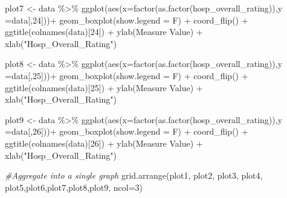 \documentclass[
]{article}
\newenvironment{Shaded}{\begin{snugshade}}{\end{snugshade}}
\newcommand{\AttributeTok}[1]{\textcolor[rgb]{0.77,0.63,0.00}{#1}}
\newcommand{\CommentTok}[1]{\textcolor[rgb]{0.56,0.35,0.01}{\textit{#1}}}
\newcommand{\DecValTok}[1]{\textcolor[rgb]{0.00,0.00,0.81}{#1}}
\newcommand{\FunctionTok}[1]{\textcolor[rgb]{0.00,0.00,0.00}{#1}}
\newcommand{\NormalTok}[1]{#1}
\newcommand{\OtherTok}[1]{\textcolor[rgb]{0.56,0.35,0.01}{#1}}
\newcommand{\SpecialCharTok}[1]{\textcolor[rgb]{0.00,0.00,0.00}{#1}}
\newcommand{\StringTok}[1]{\textcolor[rgb]{0.31,0.60,0.02}{#1}}
\begin{document}
\begin{Shaded}
\begin{Highlighting}[]
\NormalTok{plot7 }\OtherTok{\textless{}{-}}\NormalTok{ data }\SpecialCharTok{\%\textgreater{}\%} \FunctionTok{ggplot}\NormalTok{(}\FunctionTok{aes}\NormalTok{(}\AttributeTok{x=}\FunctionTok{factor}\NormalTok{(}\FunctionTok{as.factor}\NormalTok{(hosp\_overall\_rating)),}\AttributeTok{y =}\NormalTok{data[,}\DecValTok{24}\NormalTok{]))}\SpecialCharTok{+}
  \FunctionTok{geom\_boxplot}\NormalTok{(}\AttributeTok{show.legend =}\NormalTok{ F) }\SpecialCharTok{+}
  \FunctionTok{coord\_flip}\NormalTok{() }\SpecialCharTok{+}
  \FunctionTok{ggtitle}\NormalTok{(}\FunctionTok{colnames}\NormalTok{(data)[}\DecValTok{24}\NormalTok{]) }\SpecialCharTok{+} 
  \FunctionTok{ylab}\NormalTok{(}\StringTok{\textquotesingle{}Measure Value\textquotesingle{}}\NormalTok{) }\SpecialCharTok{+} \FunctionTok{xlab}\NormalTok{(}\StringTok{"Hosp\_Overall\_Rating"}\NormalTok{)}

\NormalTok{plot8 }\OtherTok{\textless{}{-}}\NormalTok{ data }\SpecialCharTok{\%\textgreater{}\%} \FunctionTok{ggplot}\NormalTok{(}\FunctionTok{aes}\NormalTok{(}\AttributeTok{x=}\FunctionTok{factor}\NormalTok{(}\FunctionTok{as.factor}\NormalTok{(hosp\_overall\_rating)),}\AttributeTok{y =}\NormalTok{data[,}\DecValTok{25}\NormalTok{]))}\SpecialCharTok{+}
  \FunctionTok{geom\_boxplot}\NormalTok{(}\AttributeTok{show.legend =}\NormalTok{ F) }\SpecialCharTok{+}
  \FunctionTok{coord\_flip}\NormalTok{() }\SpecialCharTok{+}
  \FunctionTok{ggtitle}\NormalTok{(}\FunctionTok{colnames}\NormalTok{(data)[}\DecValTok{25}\NormalTok{]) }\SpecialCharTok{+} 
  \FunctionTok{ylab}\NormalTok{(}\StringTok{\textquotesingle{}Measure Value\textquotesingle{}}\NormalTok{) }\SpecialCharTok{+} \FunctionTok{xlab}\NormalTok{(}\StringTok{"Hosp\_Overall\_Rating"}\NormalTok{)}

\NormalTok{plot9 }\OtherTok{\textless{}{-}}\NormalTok{ data }\SpecialCharTok{\%\textgreater{}\%} \FunctionTok{ggplot}\NormalTok{(}\FunctionTok{aes}\NormalTok{(}\AttributeTok{x=}\FunctionTok{factor}\NormalTok{(}\FunctionTok{as.factor}\NormalTok{(hosp\_overall\_rating)),}\AttributeTok{y =}\NormalTok{data[,}\DecValTok{26}\NormalTok{]))}\SpecialCharTok{+}
  \FunctionTok{geom\_boxplot}\NormalTok{(}\AttributeTok{show.legend =}\NormalTok{ F) }\SpecialCharTok{+}
  \FunctionTok{coord\_flip}\NormalTok{() }\SpecialCharTok{+}
  \FunctionTok{ggtitle}\NormalTok{(}\FunctionTok{colnames}\NormalTok{(data)[}\DecValTok{26}\NormalTok{]) }\SpecialCharTok{+} 
  \FunctionTok{ylab}\NormalTok{(}\StringTok{\textquotesingle{}Measure Value\textquotesingle{}}\NormalTok{) }\SpecialCharTok{+} \FunctionTok{xlab}\NormalTok{(}\StringTok{"Hosp\_Overall\_Rating"}\NormalTok{)}


\CommentTok{\#Aggregate into a single graph}
\FunctionTok{grid.arrange}\NormalTok{(plot1, plot2, plot3, plot4, plot5,plot6,plot7,plot8,plot9, }\AttributeTok{ncol=}\DecValTok{3}\NormalTok{)}
\end{Highlighting}
\end{Shaded}
\end{document}
